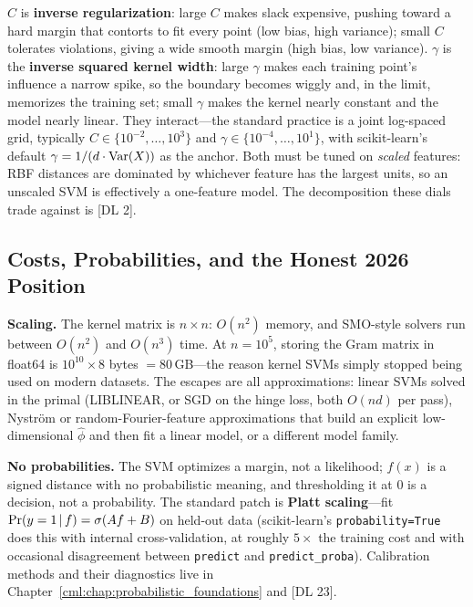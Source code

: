 \begin{keyinsight}
$C$ is \textbf{inverse regularization}: large $C$ makes slack expensive, pushing toward a hard margin that contorts to fit every point (low bias, high variance); small $C$ tolerates violations, giving a wide smooth margin (high bias, low variance). $\gamma$ is the \textbf{inverse squared kernel width}: large $\gamma$ makes each training point's influence a narrow spike, so the boundary becomes wiggly and, in the limit, memorizes the training set; small $\gamma$ makes the kernel nearly constant and the model nearly linear. They interact---the standard practice is a joint log-spaced grid, typically $C \in \{10^{-2},\dots,10^{3}\}$ and $\gamma \in \{10^{-4},\dots,10^{1}\}$, with scikit-learn's default $\gamma = 1/(d\cdot \operatorname{Var}(X))$ as the anchor. Both must be tuned on \emph{scaled} features: RBF distances are dominated by whichever feature has the largest units, so an unscaled SVM is effectively a one-feature model. The decomposition these dials trade against is [DL 2].
\end{keyinsight}

\subsection{Costs, Probabilities, and the Honest 2026 Position}

\textbf{Scaling.} The kernel matrix is $n \times n$: $O(n^2)$ memory, and SMO-style solvers run between $O(n^2)$ and $O(n^3)$ time. At $n = 10^5$, storing the Gram matrix in float64 is $10^{10}\times 8$ bytes $= 80$\,GB---the reason kernel SVMs simply stopped being used on modern datasets. The escapes are all approximations: linear SVMs solved in the primal (LIBLINEAR, or SGD on the hinge loss, both $O(nd)$ per pass), Nystr\"om or random-Fourier-feature approximations that build an explicit low-dimensional $\hat\phi$ and then fit a linear model, or a different model family.

\textbf{No probabilities.} The SVM optimizes a margin, not a likelihood; $f(x)$ is a signed distance with no probabilistic meaning, and thresholding it at $0$ is a decision, not a probability. The standard patch is \textbf{Platt scaling}---fit $\Pr(y=1\,|\, f) = \sigma(Af+B)$ on held-out data (scikit-learn's \texttt{probability=True} does this with internal cross-validation, at roughly $5\times$ the training cost and with occasional disagreement between \texttt{predict} and \texttt{predict\_proba}). Calibration methods and their diagnostics live in Chapter~\ref{cml:chap:probabilistic_foundations} and [DL 23].

